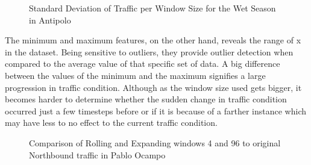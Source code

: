\begin{figure}[h] 
\centering
  \centering
  \caption{Standard Deviation of Traffic per Window Size for the Wet Season in Antipolo}
  \label{stDev}
\end{figure}


The minimum and maximum features, on the other hand, reveals the range of x in the dataset. Being sensitive to outliers, they provide outlier detection when compared to the average value of that specific set of data. A big difference between the values of the minimum and the maximum signifies a large progression in traffic condition. Although as the window size used gets bigger, it becomes harder to determine whether the sudden change in traffic condition occurred just a few timesteps before or if it is because of a farther instance which may have less to no effect to the current traffic condition. 

\begin{figure}[h] 
\centering
    \centering
      \captionsetup{justification=centering}
    \hfill
    \caption{Comparison of Rolling and Expanding windows 4 and 96 to original Northbound traffic in Pablo Ocampo}
\end{figure}


